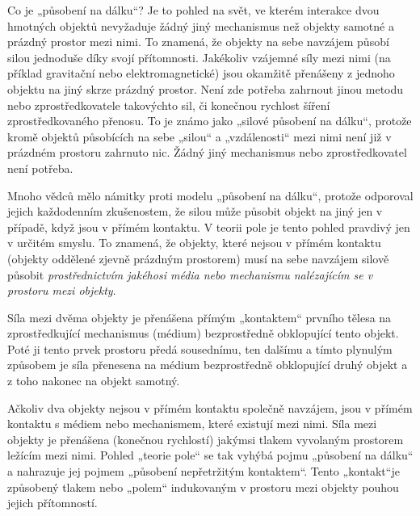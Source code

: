       Co je „působení na dálku“? Je to pohled na svět, ve kterém interakce dvou hmotných objektů
      nevyžaduje žádný jiný mechanismus než objekty samotné a prázdný prostor mezi nimi. To znamená,
      že objekty na sebe navzájem působí silou jednoduše díky svojí přítomnosti. Jakékoliv vzájemné
      síly mezi nimi (na příklad gravitační nebo elektromagnetické) jsou okamžitě přenášeny z
      jednoho objektu na jiný skrze prázdný prostor. Není zde potřeba zahrnout jinou metodu nebo
      zprostředkovatele takovýchto sil, či konečnou rychlost šíření zprostředkovaného přenosu. To je
      známo jako „silové působení na dálku“, protože kromě objektů působících na sebe „silou“ a
      „vzdálenosti“ mezi nimi není již v prázdném prostoru zahrnuto nic. Žádný jiný mechanismus nebo
      zprostředkovatel není potřeba.
    
      Mnoho vědců mělo námitky proti modelu „působení na dálku“, protože odporoval jejich
      každodenním zkušenostem, že silou může působit objekt na jiný jen v případě, když jsou v
      přímém kontaktu. V teorii pole je tento pohled pravdivý jen v určitém smyslu. To znamená, že
      objekty, které nejsou v přímém kontaktu (objekty oddělené zjevně prázdným prostorem) musí na
      sebe navzájem silově působit \emph{prostřednictvím jakéhosi média nebo mechanismu nalézajícím
      se v prostoru mezi objekty}.
    
      Síla mezi dvěma objekty je přenášena přímým „kontaktem“ prvního tělesa na zprostředkující
      mechanismus (médium) bezprostředně obklopující tento objekt. Poté ji tento prvek prostoru
      předá sousednímu, ten dalšímu a tímto plynulým způsobem je síla přenesena na médium
      bezprostředně obklopující druhý objekt a z toho nakonec na objekt samotný.
    
      Ačkoliv dva objekty nejsou v přímém kontaktu společně navzájem, jsou v přímém kontaktu s
      médiem nebo mechanismem, které existují mezi nimi. Síla mezi objekty je přenášena (konečnou
      rychlostí) jakýmsi tlakem vyvolaným prostorem ležícím mezi nimi. Pohled „teorie pole“ se tak
      vyhýbá pojmu „působení na dálku“ a nahrazuje jej pojmem „působení nepřetržitým kontaktem“.
      Tento „kontakt“je způsobený tlakem nebo „polem“ indukovaným v prostoru mezi objekty pouhou
      jejich přítomností.

